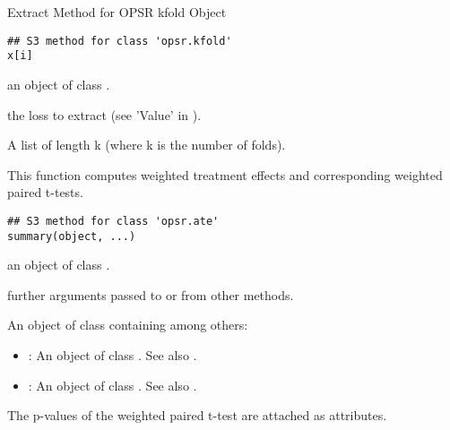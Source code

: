 
\HeaderA{[.opsr.kfold}{Extract Method for OPSR kfold Object}{[.opsr.kfold}
%
\begin{Description}
Extract Method for OPSR kfold Object
\end{Description}
%
\begin{Usage}
\begin{verbatim}
## S3 method for class 'opsr.kfold'
x[i]
\end{verbatim}
\end{Usage}
%
\begin{Arguments}
\begin{ldescription}
\item[\code{x}] an object of class .

\item[\code{i}] the loss to extract (see 'Value' in ).
\end{ldescription}
\end{Arguments}
%
\begin{Value}
A list of length k (where k is the number of folds).
\end{Value}
%
\begin{SeeAlso}
\end{SeeAlso}


%
\begin{Description}
This function computes weighted treatment effects and corresponding weighted
paired t-tests.
\end{Description}
%
\begin{Usage}
\begin{verbatim}
## S3 method for class 'opsr.ate'
summary(object, ...)
\end{verbatim}
\end{Usage}
%
\begin{Arguments}
\begin{ldescription}
\item[\code{object}] an object of class .

\item[\code{...}] further arguments passed to or from other methods.
\end{ldescription}
\end{Arguments}
%
\begin{Value}
An object of class  containing among others:
\begin{itemize}

\item{} : An object of class . See also .
\item{} : An object of class . See also .

\end{itemize}


The p-values of the weighted paired t-test are attached as attributes.
\end{Value}


